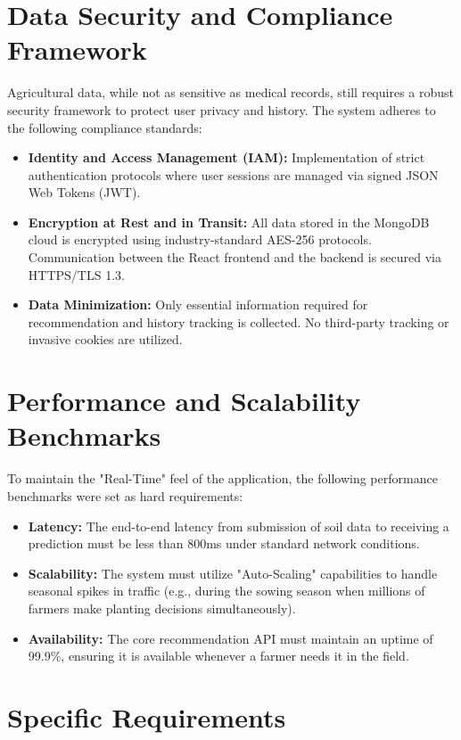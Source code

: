 \documentclass[12pt,a4paper]{report}
\begin{document}
\section{Data Security and Compliance Framework}
Agricultural data, while not as sensitive as medical records, still requires a robust security framework to protect user privacy and history. The system adheres to the following compliance standards:
\begin{itemize}
    \item \textbf{Identity and Access Management (IAM):} Implementation of strict authentication protocols where user sessions are managed via signed JSON Web Tokens (JWT).
    \item \textbf{Encryption at Rest and in Transit:} All data stored in the MongoDB cloud is encrypted using industry-standard AES-256 protocols. Communication between the React frontend and the backend is secured via HTTPS/TLS 1.3.
    \item \textbf{Data Minimization:} Only essential information required for recommendation and history tracking is collected. No third-party tracking or invasive cookies are utilized.
\end{itemize}

\section{Performance and Scalability Benchmarks}
To maintain the "Real-Time" feel of the application, the following performance benchmarks were set as hard requirements:
\begin{itemize}
    \item \textbf{Latency:} The end-to-end latency from submission of soil data to receiving a prediction must be less than 800ms under standard network conditions.
    \item \textbf{Scalability:} The system must utilize "Auto-Scaling" capabilities to handle seasonal spikes in traffic (e.g., during the sowing season when millions of farmers make planting decisions simultaneously).
    \item \textbf{Availability:} The core recommendation API must maintain an uptime of 99.9\%, ensuring it is available whenever a farmer needs it in the field.
\end{itemize}

\section{Specific Requirements}
\end{document}
